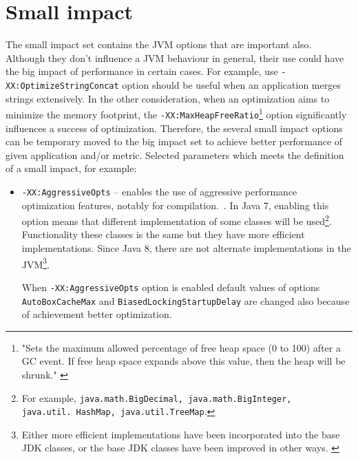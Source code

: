 \documentclass[
  digital, %
  oneside,
  notable, %
  nolof,     %
  nolot     %
]{fithesis3}
\begin{document}
\section{Small impact}
The small impact set contains the JVM options that are important also. Although they don't influence a JVM behaviour in general, their use could have the big impact of performance in certain cases. For example, use \texttt{-XX:OptimizeStringConcat} option should be useful when an application merges strings extensively. In the other consideration, when an optimization aims to minimize the memory footprint, the \texttt{-XX:MaxHeapFreeRatio}\footnote{"Sets the maximum allowed percentage of free heap space (0 to 100) after a GC event. If free heap space expands above this value, then the heap will be shrunk." \cite{java}} option significantly influences a success of optimization.
Therefore, the several small impact options can be temporary moved to the big impact set to achieve better performance of given application and/or metric.
Selected parameters which meets the definition of a small impact, for example:
\begin{itemize}
	\item \texttt{-XX:AggressiveOpts} -- enables the use of aggressive performance optimization features, notably for compilation.~\cite{java}. In Java 7, enabling this option means that different implementation of some classes will be used\footnote{For example, \texttt{java.math.BigDecimal, java.math.BigInteger, java.util.\ HashMap, java.util.TreeMap}.}. Functionality these classes is the same but they have more efficient implementations. Since Java 8, there are not alternate implementations in the JVM\footnote{Either more efficient implementations have been incorporated into the base JDK classes, or the base JDK classes have been improved in other ways. \cite{scott}}.
	
	When \texttt{-XX:AggressiveOpts} option is enabled default values of options \texttt{AutoBoxCacheMax} and \texttt{BiasedLockingStartupDelay} are changed also because of achievement better optimization.
	
\end{itemize}
\end{document}
